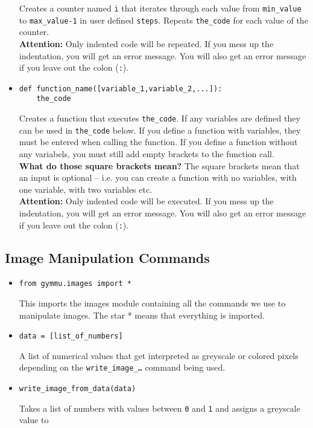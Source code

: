 \documentclass[11pt,a4paper]{report}
\begin{document}
\begin{itemize}
Creates a \gls{counter} named \texttt{i} that iterates through each value from \texttt{min\_value} to \texttt{max\_value-1} in user defined \texttt{steps}. Repeats \texttt{the\_code} for each value of the counter.\\
{\bf Attention:} Only indented code will be repeated. If you mess  up the indentation, you will get an error message.  You will also get an error message if you leave out the colon (\texttt{:}).

\item \begin{lstlisting}
def function_name([variable_1,variable_2,...]):
	the_code
\end{lstlisting}

Creates a \gls{function}  that executes \texttt{the\_code}. If any variables are defined they can be used in \texttt{the\_code} below. If you define a function with variables, they must be entered when  calling the  function. If you define a function without any variabels, you must still add empty brackets to  the function call.  \\
{\bf What do those square brackets mean?} The square brackets mean that an input  is optional -- i.e. you can create a function with no variables, with one variable, with  two variables etc.  \\
 {\bf Attention:} Only indented code will be executed. If you mess  up the indentation, you will get an error message. You will also get an error message if you leave out the colon (\texttt{:}).
 
 
 \end{itemize}
 
 \subsection{Image Manipulation Commands}
 
 \begin{itemize}
\item \begin{lstlisting}
from gymmu.images import *
\end{lstlisting}

This imports the images \gls{module} containing all the commands we use to manipulate images. The star * means that everything is imported.


\item \begin{lstlisting}
data = [list_of_numbers]
\end{lstlisting}

A list of numerical values that get interpreted as greyscale or colored pixels depending on the \texttt{write\_image\_\ldots} command being used.


\item \begin{lstlisting}
write_image_from_data(data)
\end{lstlisting}

Takes a list of numbers with values between \texttt{0} and \texttt{1} and assigns a greyscale value to 
\end{itemize}

\printglossary
\end{document}
